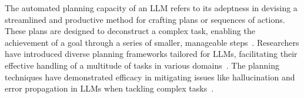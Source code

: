 The automated planning capacity of an LLM refers to its adeptness in
devising a streamlined and productive method for crafting plans or
sequences of actions. These plans are designed to deconstruct a
complex task, enabling the achievement of a goal through a series of
smaller, manageable
steps~\cite{valmeekam2023on,pallagani2023understanding}. Researchers
have introduced diverse planning frameworks tailored for LLMs,
facilitating their effective handling of a multitude of tasks in
various
domains~\cite{zhuang2024toolchain,hu2023avis,yao2023react,prasad2023adapt}.
%
The planning techniques have demonstrated efficacy in mitigating
issues like hallucination and error propagation in LLMs when tackling
complex tasks~\cite{yao2023react}.



